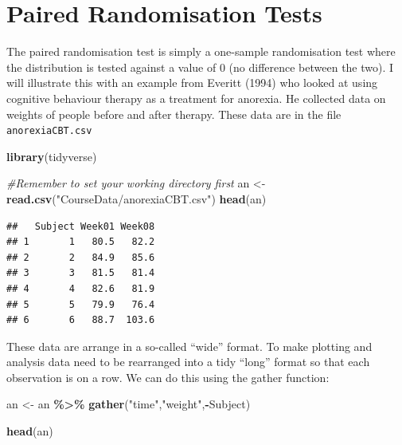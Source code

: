 \documentclass[
  a4paperpaper,
]{book}
\newenvironment{Shaded}{\begin{snugshade}}{\end{snugshade}}
\newcommand{\CommentTok}[1]{\textcolor[rgb]{0.56,0.35,0.01}{\textit{#1}}}
\newcommand{\KeywordTok}[1]{\textcolor[rgb]{0.13,0.29,0.53}{\textbf{#1}}}
\newcommand{\NormalTok}[1]{#1}
\newcommand{\OperatorTok}[1]{\textcolor[rgb]{0.81,0.36,0.00}{\textbf{#1}}}
\newcommand{\StringTok}[1]{\textcolor[rgb]{0.31,0.60,0.02}{#1}}
\begin{document}
\hypertarget{paired-randomisation-tests}{%
\section{Paired Randomisation Tests}\label{paired-randomisation-tests}}

The paired randomisation test is simply a one-sample randomisation test where the distribution is tested against a value of 0 (no difference between the two). I will illustrate this with an example from Everitt (1994) who looked at using cognitive behaviour therapy as a treatment for anorexia. He collected data on weights of people before and after therapy. These data are in the file \texttt{anorexiaCBT.csv}

\begin{Shaded}
\begin{Highlighting}[]
\KeywordTok{library}\NormalTok{(tidyverse)}
\end{Highlighting}
\end{Shaded}

\begin{Shaded}
\begin{Highlighting}[]
\CommentTok{\#Remember to set your working directory first}
\NormalTok{an \textless{}{-}}\StringTok{ }\KeywordTok{read.csv}\NormalTok{(}\StringTok{"CourseData/anorexiaCBT.csv"}\NormalTok{)}
\KeywordTok{head}\NormalTok{(an)}
\end{Highlighting}
\end{Shaded}

\begin{verbatim}
##   Subject Week01 Week08
## 1       1   80.5   82.2
## 2       2   84.9   85.6
## 3       3   81.5   81.4
## 4       4   82.6   81.9
## 5       5   79.9   76.4
## 6       6   88.7  103.6
\end{verbatim}

These data are arrange in a so-called ``wide'' format. To make plotting and analysis data need to be rearranged into a tidy ``long'' format so that each observation is on a row. We can do this using the gather function:

\begin{Shaded}
\begin{Highlighting}[]
\NormalTok{an \textless{}{-}}\StringTok{ }\NormalTok{an }\OperatorTok{\%\textgreater{}\%}
\StringTok{  }\KeywordTok{gather}\NormalTok{(}\StringTok{"time"}\NormalTok{,}\StringTok{"weight"}\NormalTok{,}\OperatorTok{{-}}\NormalTok{Subject)}

\KeywordTok{head}\NormalTok{(an)}
\end{Highlighting}
\end{Shaded}
\end{document}
